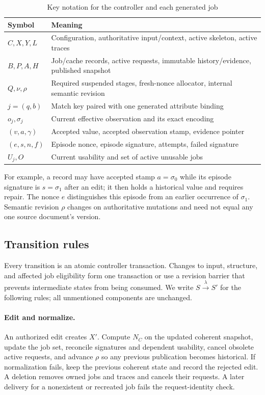 \documentclass[pdflatex,sn-mathphys-num]{sn-jnl}
\theoremstyle{thmstyleone}
\theoremstyle{thmstylethree}
\theoremstyle{thmstyletwo}
\newcommand{\Sig}{\sigma}
\begin{document}
\begin{table}[tb]
\caption{Key notation for the controller and each generated job}\label{tab:notation}
\small\begin{tabularx}{\linewidth}{@{}lX@{}}\toprule
Symbol & Meaning\\\midrule
$C,X,Y,L$ & Configuration, authoritative input/context, active skeleton, active traces\\
$B,P,A,H$ & Job/cache records, active requests, immutable history/evidence, published snapshot\\
$Q,\nu,\rho$ & Required suspended stages, fresh-nonce allocator, internal semantic revision\\
$j=(q,b)$ & Match key paired with one generated attribute binding\\
$o_j,\Sig_j$ & Current effective observation and its exact encoding\\
$(v,a,\gamma)$ & Accepted value, accepted observation stamp, evidence pointer\\
$(e,s,n,f)$ & Episode nonce, episode signature, attempts, failed signature\\
$U_j,O$ & Current usability and set of active unusable jobs\\\bottomrule
\end{tabularx}
\end{table}
For example, a record may have accepted stamp $a=\Sig_0$ while its episode signature is $s=\Sig_1$ after an edit; it then holds a historical value and requires repair. The nonce $e$ distinguishes this episode from an earlier occurrence of $\Sig_1$. Semantic revision $\rho$ changes on authoritative mutations and need not equal any one source document's version.

\subsection{Transition rules}\label{sec:rules}
Every transition is an atomic controller transaction. Changes to input, structure, and affected job eligibility form one transaction or use a revision barrier that prevents intermediate states from being consumed. We write $S\xrightarrow{\lambda}S'$ for the following rules; all unmentioned components are unchanged.

\paragraph{Edit and normalize.} An authorized edit creates $X'$. Compute $N_C$ on the updated coherent snapshot, update the job set, reconcile signatures and dependent usability, cancel obsolete active requests, and advance $\rho$ so any previous publication becomes historical. If normalization fails, keep the previous coherent state and record the rejected edit. A deletion removes owned jobs and traces and cancels their requests. A later delivery for a nonexistent or recreated job fails the request-identity check.
\end{document}
